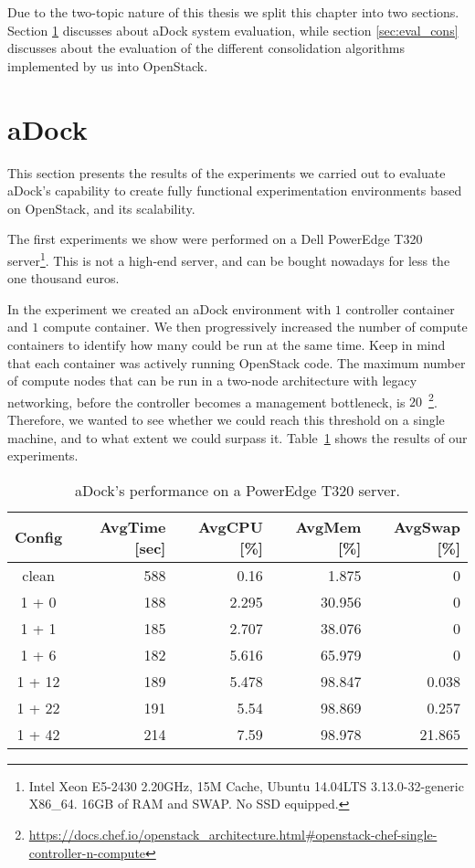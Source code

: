 
Due to the two-topic nature of this thesis we split this chapter into two sections. Section \ref{sec:eval_adock} discusses about aDock system evaluation, while section \ref{sec:eval_cons} discusses about the evaluation of the different consolidation algorithms implemented by us into OpenStack.

\section{aDock}
\label{sec:eval_adock}
This section presents the results of the experiments we carried out to evaluate aDock's capability to create fully functional experimentation environments based on OpenStack, and its scalability.

The first experiments we show were performed on a Dell PowerEdge T320 server\footnote{Intel Xeon E5-2430 2.20GHz, 15M Cache, Ubuntu 14.04LTS 3.13.0-32-generic X86\_64. 16GB of RAM and SWAP. No SSD equipped.}. This is not a high-end server, and can be bought nowadays for less the one thousand euros. 

In the experiment we created an aDock environment with $1$ controller container and $1$ compute container. We then progressively increased the number of compute containers to identify how many could be run at the same time. Keep in mind that each container was actively running OpenStack code. The maximum number of compute nodes that can be run in a two-node architecture with legacy networking, before the controller becomes a management bottleneck, is $20$~\footnote{\url{https://docs.chef.io/openstack_architecture.html\#openstack-chef-single-controller-n-compute}}. Therefore, we wanted to see whether we could reach this threshold on a single machine, and to what extent we could surpass it. Table~\ref{tab:adock_server} shows the results of our experiments.

\begin{table}[h!]
\centering
  \begin{tabular}{| c | r | r | r | r |}
  \hline
  \textbf{Config} & \textbf{AvgTime [sec]} & \textbf{AvgCPU [\%]} & \textbf{AvgMem [\%]} & \textbf{AvgSwap [\%]}  \\
  \hline
  clean & 588 & 0.16 & 1.875 & 0 \\
  \hline
  1 + 0 & 188 & 2.295 & 30.956 & 0 \\
  \hline
  1 + 1 & 185 & 2.707 & 38.076 & 0 \\
  \hline
  1 + 6 & 182 & 5.616 & 65.979 & 0 \\
  \hline
  1 + 12 & 189 & 5.478 & 98.847 & 0.038 \\
  \hline
  1 + 22 & 191 & 5.54 & 98.869 & 0.257 \\
  \hline
  1 + 42 & 214 & 7.59 & 98.978 & 21.865 \\
  \hline
  \end{tabular}
  \vspace{2mm}
  \caption{aDock's performance on a PowerEdge T320 server.}
  \label{tab:adock_server}
\end{table}

